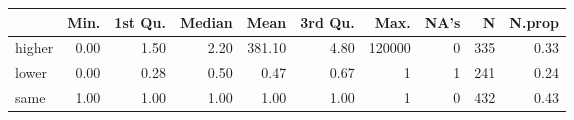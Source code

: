 \begin{table}[ht]
\centering
\begin{tabular}{lrrrrrrrrr}
  \hline
 & Min. & 1st Qu. & Median & Mean & 3rd Qu. & Max. & NA's & N & N.prop \\ 
  \hline
higher & 0.00 & 1.50 & 2.20 & 381.10 & 4.80 & 120000 &   0 & 335 & 0.33 \\ 
  lower & 0.00 & 0.28 & 0.50 & 0.47 & 0.67 &   1 &   1 & 241 & 0.24 \\ 
  same & 1.00 & 1.00 & 1.00 & 1.00 & 1.00 &   1 &   0 & 432 & 0.43 \\ 
   \hline
\end{tabular}
\end{table}
